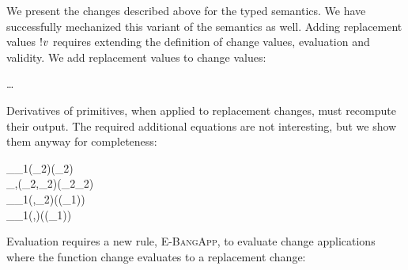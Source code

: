 We present the changes described above for the typed semantics. We have
successfully mechanized this variant of the semantics as well.
Adding replacement values \ensuremath{\mathbin{!}\Varid{v}} requires extending the definition
of change values, evaluation and validity.
We add replacement values to change values:
\begin{hscode}\SaveRestoreHook
{}%
%
%
\>[3]{}\mathbin{:=}\ldots\mid \mathbin{!}\<[E]%
\ColumnHook
\end{hscode}\resethooks
Derivatives of primitives, when applied to replacement changes,
must recompute their output. The required additional equations
are not interesting, but we show them anyway for completeness:

\begin{hscode}\SaveRestoreHook
{}%
%
%
%
\>[3]{}_{\Delta}_{1}\;(\mathbin{!}_{2}){}\<[45]%
\>[45]{}\mathrel{=}\mathbin{!}(_{2}\mathbin{+}){}\<[E]%
\\
\>[3]{}_{\Delta}\langle\text{\textunderscore},\text{\textunderscore}\rangle\;(\mathbin{!}\langle{}_{2},_{2}\rangle){}\<[45]%
\>[45]{}\mathrel{=}\mathbin{!}(_{2}\mathbin{+}_{2}){}\<[E]%
\\
\>[3]{}_{\Delta}_{1}\;(\langle{},\mathbin{!}_{2}\rangle){}\<[45]%
\>[45]{}\mathrel{=}\mathbin{!}((_{1}\oplus {})){}\<[E]%
\\
\>[3]{}_{\Delta}_{1}\;(\langle\mathbin{!},\rangle){}\<[45]%
\>[45]{}\mathrel{=}\mathbin{!}((_{1}\oplus {})){}\<[E]%
\ColumnHook
\end{hscode}\resethooks

Evaluation requires a new rule, \textsc{E-BangApp}, to evaluate
change applications where the function change evaluates to a
replacement change:

